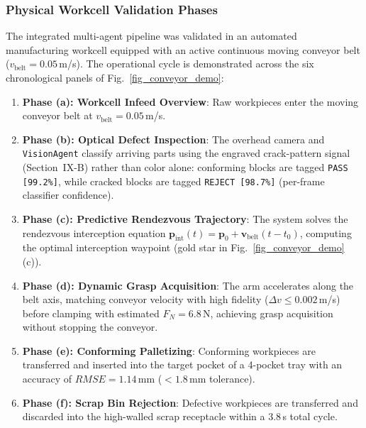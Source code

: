 \documentclass[journal]{IEEEtran}
\begin{document}
\subsubsection{Physical Workcell Validation Phases}
The integrated multi-agent pipeline was validated in an automated manufacturing workcell equipped with an active continuous moving conveyor belt ($v_{\text{belt}} = 0.05$\,m/s). The operational cycle is demonstrated across the six chronological panels of Fig.~\ref{fig_conveyor_demo}:
\begin{enumerate}
    \item \textbf{Phase (a): Workcell Infeed Overview}: Raw workpieces enter the moving conveyor belt at $v_{\text{belt}} = 0.05$\,m/s.
    \item \textbf{Phase (b): Optical Defect Inspection}: The overhead camera and \texttt{VisionAgent} classify arriving parts using the engraved crack-pattern signal (Section~IX-B) rather than color alone: conforming blocks are tagged \texttt{PASS [99.2\%]}, while cracked blocks are tagged \texttt{REJECT [98.7\%]} (per-frame classifier confidence).
    \item \textbf{Phase (c): Predictive Rendezvous Trajectory}: The system solves the rendezvous interception equation $\mathbf{p}_{\text{int}}(t) = \mathbf{p}_0 + \mathbf{v}_{\text{belt}}(t - t_0)$, computing the optimal interception waypoint (gold star in Fig.~\ref{fig_conveyor_demo}(c)).
    \item \textbf{Phase (d): Dynamic Grasp Acquisition}: The arm accelerates along the belt axis, matching conveyor velocity with high fidelity ($\Delta v \le 0.002$\,m/s) before clamping with estimated $F_N = 6.8$\,N, achieving grasp acquisition without stopping the conveyor.
    \item \textbf{Phase (e): Conforming Palletizing}: Conforming workpieces are transferred and inserted into the target pocket of a 4-pocket tray with an accuracy of $RMSE = 1.14$\,mm ($<1.8$\,mm tolerance).
    \item \textbf{Phase (f): Scrap Bin Rejection}: Defective workpieces are transferred and discarded into the high-walled scrap receptacle within a $3.8$\,s total cycle.
\end{enumerate}
\end{document}
